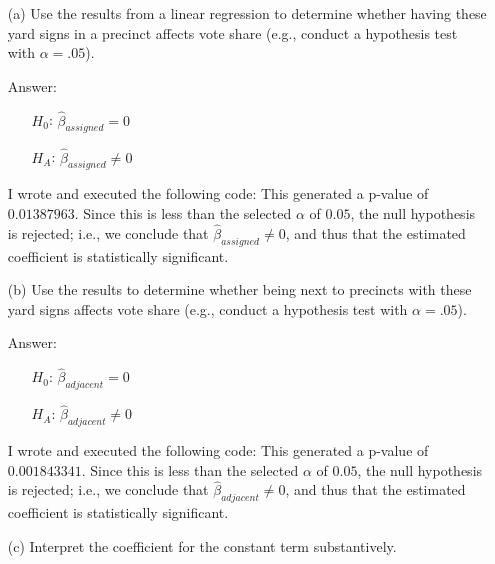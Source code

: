 \documentclass[12pt,letterpaper]{article}
\begin{document}
\begin{enumerate}
\vspace{.25cm}
	
	\item [(a)] Use the results from a linear regression to determine whether having these yard signs in a precinct affects vote share (e.g., conduct a hypothesis test with $\alpha = .05$).
	\vspace{.25cm}
	
	\item [Answer:]
	\begin{enumerate}
		\item [] $H_{0}$: $\hat{\beta}_{assigned} = 0$
		\item [] $H_{A}$: $\hat{\beta}_{assigned} \neq 0$
	\end{enumerate}
	I wrote and executed the following code:  This generated a p-value of $0.01387963$. Since this is less than the selected $\alpha$ of $0.05$, the null hypothesis is rejected; i.e., we conclude that $\hat{\beta}_{assigned} \neq 0$, and thus that the estimated coefficient is statistically significant.
	\vspace{1cm}
			
	\item [(b)]  Use the results to determine whether being
	next to precincts with these yard signs affects vote
	share (e.g., conduct a hypothesis test with $\alpha = .05$).
	\vspace{.25cm}
	
	\item [Answer:]
	\begin{enumerate}
		\item [] $H_{0}$: $\hat{\beta}_{adjacent} = 0$
		\item [] $H_{A}$: $\hat{\beta}_{adjacent} \neq 0$
	\end{enumerate}
	I wrote and executed the following code:  This generated a p-value of $0.001843341$. Since this is less than the selected $\alpha$ of $0.05$, the null hypothesis is rejected; i.e., we conclude that $\hat{\beta}_{adjacent} \neq 0$, and thus that the estimated coefficient is statistically significant.
	\vspace{1cm}
	
	\item [(c)] Interpret the coefficient for the constant term substantively.
	\vspace{.25cm}
	

\end{enumerate}
\end{document}
